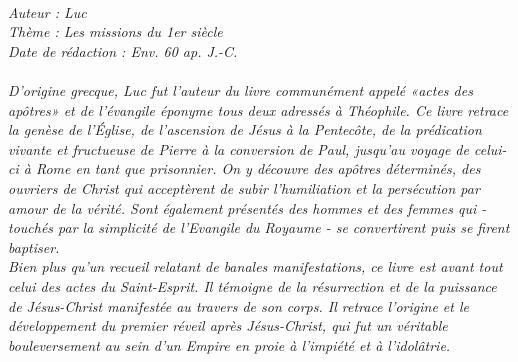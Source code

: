 \BFont
\noindent\hrulefill
{\footnotesize
\textit{
\bigskip
{\centering{}
\\Auteur : Luc
\\Thème : Les missions du 1er siècle
\\Date de rédaction : Env. 60 ap. J.-C.\\}
}
\textit{
\\D'origine grecque, Luc fut l'auteur du livre communément appelé «actes des apôtres» et de l'évangile éponyme tous
deux adressés à Théophile. Ce livre retrace la genèse de l'Église, de l'ascension de Jésus à la Pentecôte, de la prédication vivante et fructueuse de Pierre à la conversion de Paul, jusqu'au voyage de celui-ci à Rome en tant que prisonnier. On y découvre des apôtres déterminés, des ouvriers de Christ qui acceptèrent de subir l'humiliation et la persécution par amour de la vérité. Sont également présentés des hommes et des femmes qui - touchés par la simplicité de l'Evangile du Royaume - se convertirent puis se firent baptiser.
\\Bien plus qu'un recueil relatant de banales manifestations, ce livre est avant tout celui des actes du Saint-Esprit. Il témoigne de la résurrection et de la puissance de Jésus-Christ manifestée au travers de son corps. Il retrace l'origine et le développement du premier réveil après Jésus-Christ, qui fut un véritable bouleversement au sein d'un Empire en proie à l'impiété et à l'idolâtrie.\bigskip
}
}
\par\nobreak\noindent\hrulefill
